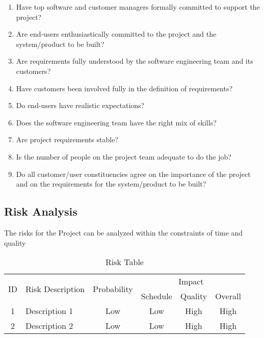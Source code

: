 \documentclass[oneside,a4paper,12pt]{report}
\begin{document}
\begin{enumerate}
\item Have top software and customer managers formally committed to support the project?
\item Are end-users enthusiastically committed to the project and the system/product to be built?
\item Are requirements fully understood by the software engineering team and its customers?
\item Have customers been involved fully in the definition of requirements?
\item Do end-users have realistic expectations?
\item Does the software engineering team have the right mix of skills?
\item Are project requirements stable?
\item Is the number of people on the project team adequate to do the job?
\item Do all customer/user constituencies agree on the importance of the project and on the requirements for the system/product to be built?
\end{enumerate}

\subsection{Risk Analysis}
The risks for the Project can be analyzed within the constraints of time and quality

\begin{table}[!htbp]
\begin{center}
\def\arraystretch{1.5}
\begin{tabularx}{\textwidth}{| c | X | c | c | c | c |}
\hline
\multirow{2}{*}{ID} & \multirow{2}{*}{Risk Description}	& \multirow{2}{*}{Probability} & \multicolumn{3}{|c|}{Impact} \\ \cline{4-6}
	& & &	Schedule	& Quality	& Overall \\ \hline
1	& Description 1	& Low	& Low	& High	& High \\ \hline
2	& Description 2	& Low	& Low	& High	& High \\ \hline
\end{tabularx}
\end{center}
\caption{Risk Table}
\label{tab:risk}
\end{table}
\end{document}
